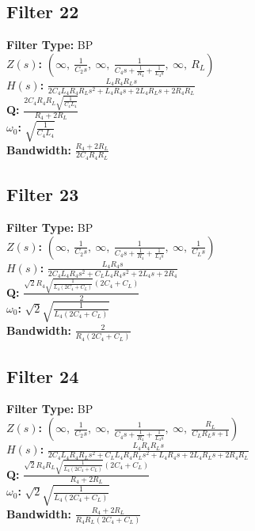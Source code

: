 \documentclass{article}
\begin{document}
\subsection*{Filter 22}
\textbf{Filter Type:} BP \\ 
\textbf{$Z(s)$:} $\left( \infty, \  \frac{1}{C_{2} s}, \  \infty, \  \frac{1}{C_{4} s + \frac{1}{R_{4}} + \frac{1}{L_{4} s}}, \  \infty, \  R_{L}\right)$ \\ 
\textbf{$H(s)$:} $\frac{L_{4} R_{4} R_{L} s}{2 C_{4} L_{4} R_{4} R_{L} s^{2} + L_{4} R_{4} s + 2 L_{4} R_{L} s + 2 R_{4} R_{L}}$ \\ 
\textbf{Q:} $\frac{2 C_{4} R_{4} R_{L} \sqrt{\frac{1}{C_{4} L_{4}}}}{R_{4} + 2 R_{L}}$ \\ 
\textbf{$\omega_0$:} $\sqrt{\frac{1}{C_{4} L_{4}}}$ \\ 
\textbf{Bandwidth:} $\frac{R_{4} + 2 R_{L}}{2 C_{4} R_{4} R_{L}}$ \\ 
\subsection*{Filter 23}
\textbf{Filter Type:} BP \\ 
\textbf{$Z(s)$:} $\left( \infty, \  \frac{1}{C_{2} s}, \  \infty, \  \frac{1}{C_{4} s + \frac{1}{R_{4}} + \frac{1}{L_{4} s}}, \  \infty, \  \frac{1}{C_{L} s}\right)$ \\ 
\textbf{$H(s)$:} $\frac{L_{4} R_{4} s}{2 C_{4} L_{4} R_{4} s^{2} + C_{L} L_{4} R_{4} s^{2} + 2 L_{4} s + 2 R_{4}}$ \\ 
\textbf{Q:} $\frac{\sqrt{2} R_{4} \sqrt{\frac{1}{L_{4} \left(2 C_{4} + C_{L}\right)}} \left(2 C_{4} + C_{L}\right)}{2}$ \\ 
\textbf{$\omega_0$:} $\sqrt{2} \sqrt{\frac{1}{L_{4} \left(2 C_{4} + C_{L}\right)}}$ \\ 
\textbf{Bandwidth:} $\frac{2}{R_{4} \left(2 C_{4} + C_{L}\right)}$ \\ 
\subsection*{Filter 24}
\textbf{Filter Type:} BP \\ 
\textbf{$Z(s)$:} $\left( \infty, \  \frac{1}{C_{2} s}, \  \infty, \  \frac{1}{C_{4} s + \frac{1}{R_{4}} + \frac{1}{L_{4} s}}, \  \infty, \  \frac{R_{L}}{C_{L} R_{L} s + 1}\right)$ \\ 
\textbf{$H(s)$:} $\frac{L_{4} R_{4} R_{L} s}{2 C_{4} L_{4} R_{4} R_{L} s^{2} + C_{L} L_{4} R_{4} R_{L} s^{2} + L_{4} R_{4} s + 2 L_{4} R_{L} s + 2 R_{4} R_{L}}$ \\ 
\textbf{Q:} $\frac{\sqrt{2} R_{4} R_{L} \sqrt{\frac{1}{L_{4} \left(2 C_{4} + C_{L}\right)}} \left(2 C_{4} + C_{L}\right)}{R_{4} + 2 R_{L}}$ \\ 
\textbf{$\omega_0$:} $\sqrt{2} \sqrt{\frac{1}{L_{4} \left(2 C_{4} + C_{L}\right)}}$ \\ 
\textbf{Bandwidth:} $\frac{R_{4} + 2 R_{L}}{R_{4} R_{L} \left(2 C_{4} + C_{L}\right)}$ \\ 
\end{document}
